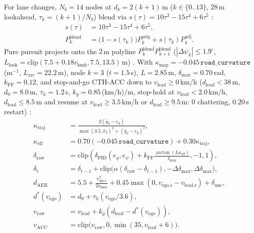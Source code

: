 \documentclass[10pt,twocolumn,letterpaper]{article}
\begin{document}
For lane changes, $N_b = 14$ nodes at $d_k = 2(k+1)$\,m ($k \in \{0..13\}$, $28$\,m lookahead, $\tau_k = (k+1)/N_b$) blend via $s(\tau) = 10\tau^3 - 15\tau^4 + 6\tau^5$ \cite{flash1985coordination,werling2010optimal}:
\begin{align}
    s(\tau) &= 10\tau^3 - 15\tau^4 + 6\tau^5, \\
    P^{\text{blend}}_k &= \big(1 - s(\tau_k)\big) P^{\text{orig}}_k + s(\tau_k) P^{\text{adj}}_k.
\end{align}
Pure pursuit projects onto the $2$\,m polyline $\overline{P^{\text{blend}}_k P^{\text{blend}}_{k+1}}$ ($|\Delta\psi_k| \le 1.9^\circ$, $L_{\text{look}} = \text{clip}(7.5 + 0.18 v_{\text{kmh}}, 7.5, 13.5)$\,m) \cite{thrun2006stanley,hoffmann2007autonomous,coulter1992implementation,paden2016survey}. With $\kappa_{\text{map}} = -0.045\,\texttt{road\_curvature}$ ($\text{m}^{-1}$, $L_{\text{arc}} = 22.2$\,m), node $k=3$ ($t=1.5$\,s), $L=2.85$\,m, $\delta_{\max}=0.70$\,rad, $k_{\text{FF}}=0.12$, and stop-and-go CTH-ACC down to $v_{\text{lead}} \ge 0$\,km/h ($d_{\text{lead}} < 38$\,m, $d_0 = 8.0$\,m, $\tau_h = 1.2$\,s, $k_g = 0.85$\,(km/h)/m, stop-hold at $v_{\text{lead}} < 2.0$\,km/h, $d_{\text{lead}} \le 8.5$\,m and resume at $v_{\text{lead}} \ge 3.5$\,km/h or $d_{\text{lead}} \ge 9.5$\,m: $0$ chattering, $0.20$\,s restart) \cite{ioannou1993autonomous,rajamani2001experimental,treiber2000congested}:
\begin{align}
    \kappa_{\text{traj}} &= \frac{2(\hat{y}_3 - e_y)}{\max(3.5, \hat{x}_3)^2 + (\hat{y}_3 - e_y)^2}, \\
    \kappa_{\text{eff}} &= 0.70(-0.045\,\texttt{road\_curvature}) + 0.30\kappa_{\text{traj}}, \\
    \delta_{\text{raw}} &= \text{clip}\!\left(\delta_{\text{PID}}(e_y, e_\psi) + k_{\text{FF}}\frac{\arctan(L\kappa_{\text{eff}})}{\delta_{\max}}, -1, 1\right), \\
    \delta_t &= \delta_{t-1} + \text{clip}\!\big(\alpha(\delta_{\text{raw}} - \delta_{t-1}), -\Delta\delta_{\max}, \Delta\delta_{\max}\big), \\
    d_{\text{AEB}} &= 5.5 + \frac{v_{\text{ego,s}}^2}{2a_{\max}} + 0.45\max(0, v_{\text{ego,s}} - v_{\text{lead,s}}) + \delta_{\text{unc}}, \\
    d^*(v_{\text{ego}}) &= d_0 + \tau_h (v_{\text{ego}}/3.6), \\
    v_{\text{raw}} &= v_{\text{lead}} + k_g(d_{\text{lead}} - d^*(v_{\text{ego}})), \\
    v_{\text{ACC}} &= \text{clip}\big(v_{\text{raw}}, 0, \min(35, v_{\text{lead}} + 6)\big).
\end{align}
\end{document}
